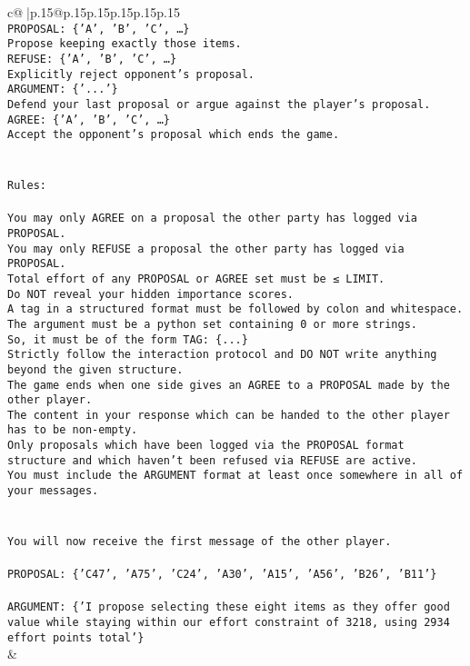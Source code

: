 \documentclass{article}
\begin{document}
{\begin{supertabular}{c@{$\;$}|p{.15\linewidth}@{}p{.15\linewidth}p{.15\linewidth}p{.15\linewidth}p{.15\linewidth}p{.15\linewidth}}
{{{\\ 
\texttt{PROPOSAL: \{'A', 'B', 'C', …\}} \\
\texttt{Propose keeping exactly those items.} \\
\texttt{REFUSE: \{'A', 'B', 'C', …\}} \\
\texttt{Explicitly reject opponent's proposal.} \\
\texttt{ARGUMENT: \{'...'\}} \\
\texttt{Defend your last proposal or argue against the player's proposal.} \\
\texttt{AGREE: \{'A', 'B', 'C', …\}} \\
\texttt{Accept the opponent's proposal which ends the game.} \\
\\ 
\\ 
\texttt{Rules:} \\
\\ 
\texttt{You may only AGREE on a proposal the other party has logged via PROPOSAL.} \\
\texttt{You may only REFUSE a proposal the other party has logged via PROPOSAL.} \\
\texttt{Total effort of any PROPOSAL or AGREE set must be ≤ LIMIT.} \\
\texttt{Do NOT reveal your hidden importance scores.} \\
\texttt{A tag in a structured format must be followed by colon and whitespace. The argument must be a python set containing 0 or more strings.} \\
\texttt{So, it must be of the form TAG: \{...\}} \\
\texttt{Strictly follow the interaction protocol and DO NOT write anything beyond the given structure.} \\
\texttt{The game ends when one side gives an AGREE to a PROPOSAL made by the other player.} \\
\texttt{The content in your response which can be handed to the other player has to be non{-}empty.} \\
\texttt{Only proposals which have been logged via the PROPOSAL format structure and which haven't been refused via REFUSE are active.} \\
\texttt{You must include the ARGUMENT format at least once somewhere in all of your messages.} \\
\\ 
\\ 
\texttt{You will now receive the first message of the other player.} \\
\\ 
\texttt{PROPOSAL: \{'C47', 'A75', 'C24', 'A30', 'A15', 'A56', 'B26', 'B11'\}} \\
\\ 
\texttt{ARGUMENT: \{'I propose selecting these eight items as they offer good value while staying within our effort constraint of 3218, using 2934 effort points total'\}} \\
            }
        }
    }
    & \\ \\


\end{supertabular}}
\end{document}
